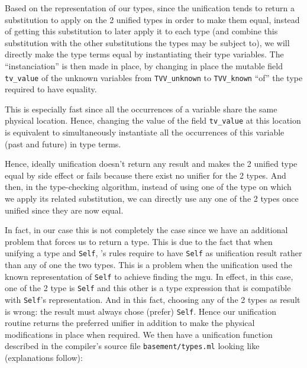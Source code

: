 Based on the representation of our types, since the unification tends
to return a substitution to apply on the 2 unified types in order to
make them equal, instead of getting this substitution to later apply
it to each type (and combine this substitution with the other
substitutions the types may be subject to), we will directly make the
type terms equal by instantiating their type variables. The
``instanciation'' is then made in place, by changing in place the
mutable field {\tt tv\_value} of the unknown variables from
{\tt TVV\_unknown} to {\tt TVV\_known} ``of'' the type required to
have equality.

This is especially fast since all the occurrences of a variable share
the same physical location. Hence, changing the value of the field
{\tt tv\_value} at this location is equivalent to simultaneously
instantiate all the occurrences of this variable (past and future) in
type terms.

Hence, ideally unification doesn't return any result and makes the 2
unified type equal by side effect or fails because there exist no
unifier for the 2 types. And then, in the type-checking algorithm,
instead of using one of the type on which we apply its related
substitution, we can directly use any one of the 2 types once unified
since they are now equal.

In fact, in our case this is not completely the case since we have an
additional problem that forces us to return a type. This is due to
the fact that when unifying a type and {\tt Self}, \focalize's rules
require to have {\tt Self} as unification result rather than any of
one the two types. This is a problem when the unification used the
known representation of {\tt Self} to achieve finding the mgu. In
effect, in this case, one of the 2 type is {\tt Self} and this other
is a type expression that is compatible with {\tt Self}'s
representation. And in this fact, choosing any of the 2 types as result
is wrong: the result must always chose (prefer) {\tt Self}. Hence our
unification routine returns the preferred unifier in addition to make
the physical modifications in place when required. We then have a
unification function described in the compiler's source file
{\tt basement/types.ml} looking like (explanations follow):

